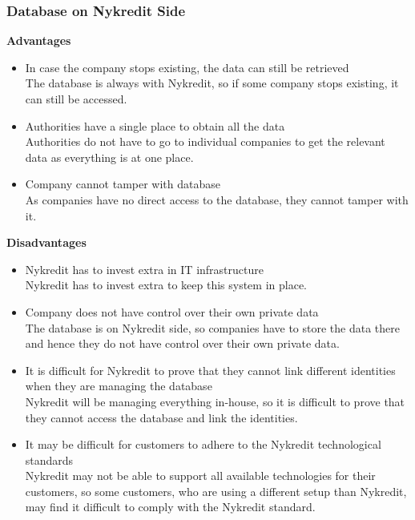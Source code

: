 \subsubsection{Database on Nykredit Side}
\textbf{Advantages}
\begin{itemize}
	\item In case the company stops existing, the data can still be retrieved
	\\The database is always with Nykredit, so if some company stops existing, it can still be accessed.
	\item Authorities have a single place to obtain all the data
	\\Authorities do not have to go to individual companies to get the relevant data as everything is at one place.
	\item Company cannot tamper with database
	\\As companies have no direct access to the database, they cannot tamper with it.
\end{itemize}
\textbf{Disadvantages}
\begin{itemize}
	\item Nykredit has to invest extra in IT infrastructure
	\\Nykredit has to invest extra to keep this system in place.
	\item Company does not have control over their own private data
	\\The database is on Nykredit side, so companies have to store the data there and hence they do not have control over their own private data.
	\item It is difficult for Nykredit to prove that they cannot link different identities when they are managing the database
	\\Nykredit will be managing everything in-house, so it is difficult to prove that they cannot access the database and link the identities.
	\item It may be difficult for customers to adhere to the Nykredit technological standards
	\\Nykredit may not be able to support all available technologies for their customers, so some customers, who are using a different setup than Nykredit, may find it difficult to comply with the Nykredit standard.
\end{itemize}
